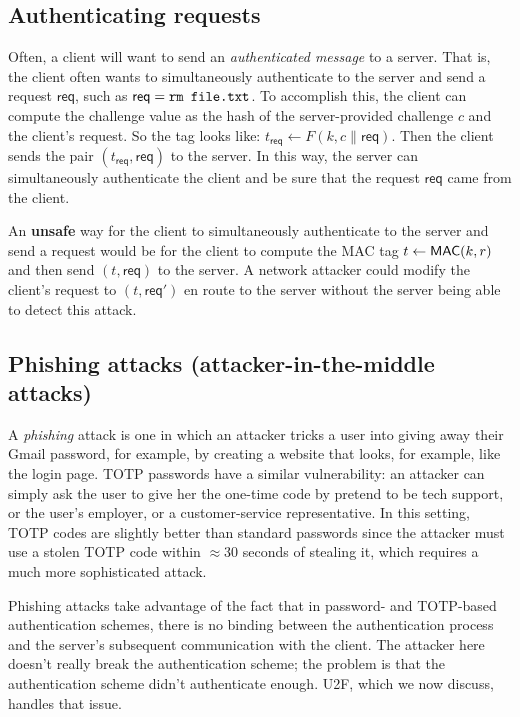 \subsection{Authenticating requests}
Often, a client will want to send an \emph{authenticated message} to a server.
That is, the client often wants to simultaneously authenticate to the server
and send a request $\mathsf{req}$, such as $\mathsf{req} = \ttt{rm file.txt}$.
To accomplish this, the client can compute the challenge value as 
the hash of the server-provided challenge $c$ and the client's request.
So the tag looks like:
$t_{\mathsf{req}} \gets F(k, c \| \mathsf{req})$.
Then the client sends the pair $(t_{\mathsf{req}}, \mathsf{req})$ to the server.
In this way, the server can simultaneously authenticate the client
and be sure that the request $\mathsf{req}$ came from the client.

An \textbf{unsafe} way for the client to simultaneously authenticate to the 
server and send a request would be for the client to compute the MAC tag $t \gets \mathsf{MAC}(k,r)$
and then send $(t, \mathsf{req})$ to the server.
A network attacker could modify the client's request to $(t, \mathsf{req'})$ en
route to the server without the server being able to detect this attack.

\subsection{Phishing attacks (attacker-in-the-middle attacks)}
A \emph{phishing} attack is one
in which an attacker tricks a user into giving away their Gmail password,
for example, by creating a website that looks, for example, like the 
login page.
TOTP passwords have a similar vulnerability:
an attacker can simply ask the user
to give her the one-time code by pretend to be
tech support, or the user's employer, or
a customer-service representative.
In this setting, TOTP 
codes are slightly better than standard passwords since the attacker
must use a stolen TOTP code within $\approx$30 seconds of stealing
it, which requires a much more sophisticated attack.

Phishing attacks take advantage of the fact that in password- and TOTP-based
authentication schemes, there is no binding between the authentication process
and the server's subsequent communication with the client.
The attacker here doesn't really break the authentication scheme; the
problem is that the authentication scheme didn't authenticate enough.
U2F, which we now discuss, handles that issue.


